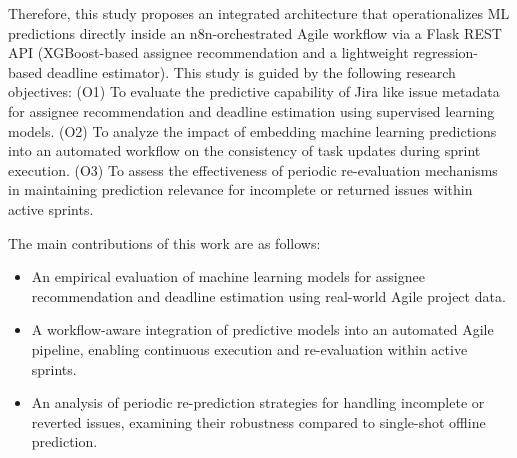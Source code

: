 \documentclass[conference]{IEEEtran}
\begin{document}
Therefore, this study proposes an integrated architecture that operationalizes ML predictions directly inside an n8n-orchestrated Agile workflow via a Flask REST API (XGBoost-based assignee recommendation and a lightweight regression-based deadline estimator). This study is guided by the following research objectives:
(O1) To evaluate the predictive capability of Jira like issue metadata for assignee recommendation and deadline estimation using supervised learning models.
(O2) To analyze the impact of embedding machine learning predictions into an automated workflow on the consistency of task updates during sprint execution.
(O3) To assess the effectiveness of periodic re-evaluation mechanisms in maintaining prediction relevance for incomplete or returned issues within active sprints.

The main contributions of this work are as follows:
\begin{itemize}
    \item An empirical evaluation of machine learning models for assignee recommendation and deadline estimation using real-world Agile project data.
    \item A workflow-aware integration of predictive models into an automated Agile pipeline, enabling continuous execution and re-evaluation within active sprints.
    \item An analysis of periodic re-prediction strategies for handling incomplete or reverted issues, examining their robustness compared to single-shot offline prediction.
\end{itemize}
\end{document}
